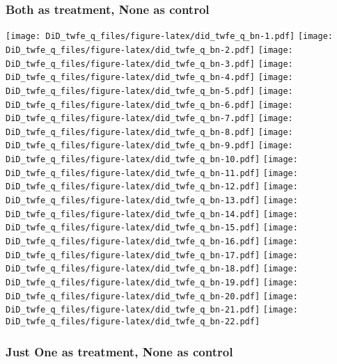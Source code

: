 \documentclass[
]{article}
\begin{document}
\hypertarget{both-as-treatment-none-as-control}{%
\subsubsection{Both as treatment, None as
control}\label{both-as-treatment-none-as-control}}

\texttt{[image: DiD\_twfe\_q\_files/figure-latex/did\_twfe\_q\_bn-1.pdf]}
\texttt{[image: DiD\_twfe\_q\_files/figure-latex/did\_twfe\_q\_bn-2.pdf]}
\texttt{[image: DiD\_twfe\_q\_files/figure-latex/did\_twfe\_q\_bn-3.pdf]}
\texttt{[image: DiD\_twfe\_q\_files/figure-latex/did\_twfe\_q\_bn-4.pdf]}
\texttt{[image: DiD\_twfe\_q\_files/figure-latex/did\_twfe\_q\_bn-5.pdf]}
\texttt{[image: DiD\_twfe\_q\_files/figure-latex/did\_twfe\_q\_bn-6.pdf]}
\texttt{[image: DiD\_twfe\_q\_files/figure-latex/did\_twfe\_q\_bn-7.pdf]}
\texttt{[image: DiD\_twfe\_q\_files/figure-latex/did\_twfe\_q\_bn-8.pdf]}
\texttt{[image: DiD\_twfe\_q\_files/figure-latex/did\_twfe\_q\_bn-9.pdf]}
\texttt{[image: DiD\_twfe\_q\_files/figure-latex/did\_twfe\_q\_bn-10.pdf]}
\texttt{[image: DiD\_twfe\_q\_files/figure-latex/did\_twfe\_q\_bn-11.pdf]}
\texttt{[image: DiD\_twfe\_q\_files/figure-latex/did\_twfe\_q\_bn-12.pdf]}
\texttt{[image: DiD\_twfe\_q\_files/figure-latex/did\_twfe\_q\_bn-13.pdf]}
\texttt{[image: DiD\_twfe\_q\_files/figure-latex/did\_twfe\_q\_bn-14.pdf]}
\texttt{[image: DiD\_twfe\_q\_files/figure-latex/did\_twfe\_q\_bn-15.pdf]}
\texttt{[image: DiD\_twfe\_q\_files/figure-latex/did\_twfe\_q\_bn-16.pdf]}
\texttt{[image: DiD\_twfe\_q\_files/figure-latex/did\_twfe\_q\_bn-17.pdf]}
\texttt{[image: DiD\_twfe\_q\_files/figure-latex/did\_twfe\_q\_bn-18.pdf]}
\texttt{[image: DiD\_twfe\_q\_files/figure-latex/did\_twfe\_q\_bn-19.pdf]}
\texttt{[image: DiD\_twfe\_q\_files/figure-latex/did\_twfe\_q\_bn-20.pdf]}
\texttt{[image: DiD\_twfe\_q\_files/figure-latex/did\_twfe\_q\_bn-21.pdf]}
\texttt{[image: DiD\_twfe\_q\_files/figure-latex/did\_twfe\_q\_bn-22.pdf]}

\hypertarget{just-one-as-treatment-none-as-control}{%
\subsubsection{Just One as treatment, None as
control}\label{just-one-as-treatment-none-as-control}}
\end{document}
